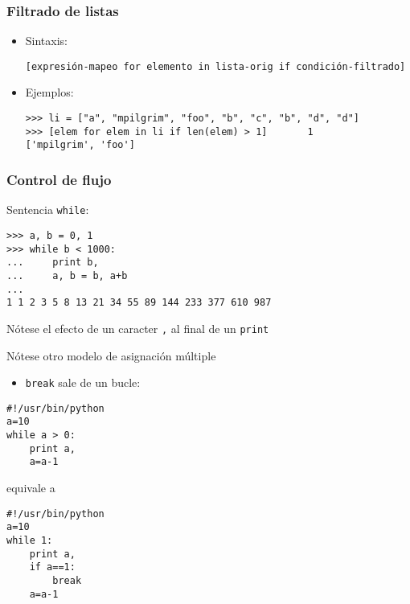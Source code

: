 \begin{frame}[fragile]
\frametitle{Filtrado de listas}
\begin{itemize}
\item Sintaxis:
\begin{footnotesize}
\begin{verbatim}
[expresión-mapeo for elemento in lista-orig if condición-filtrado]
\end{verbatim}
\end{footnotesize}
\item Ejemplos:
\begin{footnotesize}
\begin{verbatim}
>>> li = ["a", "mpilgrim", "foo", "b", "c", "b", "d", "d"]
>>> [elem for elem in li if len(elem) > 1]       1
['mpilgrim', 'foo']
\end{verbatim}
\end{footnotesize}

\end{itemize}
 
\end{frame}








\begin{frame}[fragile]
 
\frametitle{Control de flujo}
Sentencia \verb|while|:
\begin{footnotesize}
\begin{verbatim}
>>> a, b = 0, 1
>>> while b < 1000:
...     print b,
...     a, b = b, a+b
... 
1 1 2 3 5 8 13 21 34 55 89 144 233 377 610 987
\end{verbatim}
\end{footnotesize}
Nótese el efecto de un caracter \verb|,| al final de un \verb|print|

Nótese otro modelo de asignación múltiple 

\end{frame}


\begin{frame}[fragile]

\begin{itemize}
  
\item 
\verb|break| sale de un bucle:
\end{itemize}

\begin{footnotesize}
\begin{verbatim}
#!/usr/bin/python
a=10
while a > 0:
    print a,
    a=a-1

\end{verbatim}
\end{footnotesize}

equivale a 

\begin{footnotesize}
\begin{verbatim}
#!/usr/bin/python
a=10
while 1:
    print a,
    if a==1:
        break
    a=a-1
\end{verbatim}
\end{footnotesize}
\end{frame}




